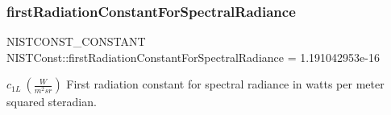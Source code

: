 \subsubsection{\texorpdfstring{first\+Radiation\+Constant\+For\+Spectral\+Radiance}{firstRadiationConstantForSpectralRadiance}}
{\footnotesize\ttfamily N\+I\+S\+T\+C\+O\+N\+S\+T\+\_\+\+C\+O\+N\+S\+T\+A\+NT N\+I\+S\+T\+Const\+::first\+Radiation\+Constant\+For\+Spectral\+Radiance = 1.\+191042953e-\/16}

$c_{1L} \ (\frac{W}{m^2 sr})$ First radiation constant for spectral radiance in watts per meter squared steradian. 